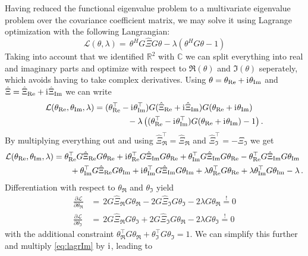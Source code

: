 Having reduced the functional eigenvalue problem to a multivariate eigenvalue problem over the covariance coefficient matrix, we may solve it using Lagrange optimization with the following Langrangian:
\begin{equation}
  \mathcal{L}(\theta,\lambda) = \, \theta^H G \hat{\Xi} G \theta - \lambda ( \theta^H G \theta - 1)
\end{equation}
Taking into account that we identified $\mathbb{R}^2$ with $\mathbb{C}$ we can split everything into real and imaginary parts and optimize with respect to $\Re(\theta)$ and $\Im(\theta)$ seperately, which avoids having to take complex derivatives.
Using $\theta = \theta_{\mathrm{Re}} + \mathrm{i}\mkern1mu \theta_{\mathrm{Im}}$ and $\hat{\Xi} = \hat\Xi_{\mathrm{Re}} + \mathrm{i}\mkern1mu \hat\Xi_{\mathrm{Im}}$ we can write
\begin{align*}
  \mathcal{L}(\theta_{\mathrm{Re}},\theta_{\mathrm{Im}},\lambda) & = 
    (\theta_{\mathrm{Re}}^\top - \mathrm{i}\mkern1mu \theta_{\mathrm{Im}}^\top) G ( \hat{\Xi}_{\mathrm{Re}} + \mathrm{i}\mkern1mu \hat\Xi_{\mathrm{Im}} ) G ( \theta_{\mathrm{Re}} + \mathrm{i}\mkern1mu \theta_{\mathrm{Im}} ) \\
  & \qquad \qquad - \lambda \left( (\theta_{\mathrm{Re}}^\top - \mathrm{i}\mkern1mu \theta_{\mathrm{Im}}^\top ) G (\theta_{\mathrm{Re}} + \mathrm{i}\mkern1mu \theta_{\mathrm{Im}}) - 1 \right).
\end{align*}
By multiplying everything out and using $\hat\Xi_\Re^\top = \hat\Xi_\Re$ and $\hat\Xi_\Im^\top = - \hat\Xi_\Im$ we get
\begin{align*}
  \mathcal{L}(\theta_{\mathrm{Re}},\theta_{\mathrm{Im}},\lambda) 
  & = \theta_{\mathrm{Re}}^\top G \hat\Xi_{\mathrm{Re}} G \theta_{\mathrm{Re}} 
    + \mathrm{i}\mkern1mu \theta_{\mathrm{Re}}^\top G \hat\Xi_{\mathrm{Im}} G \theta_{\mathrm{Re}} 
    + \theta_{\mathrm{Im}}^\top G \hat\Xi_{\mathrm{Im}} G \theta_{\mathrm{Re}}
    - \theta_{\mathrm{Re}}^\top G \hat\Xi_{\mathrm{Im}} G \theta_{\mathrm{Im}} \\
  & \qquad  + \theta_{\mathrm{Im}}^\top G \hat\Xi_{\mathrm{Re}} G \theta_{\mathrm{Im}}
    + \mathrm{i}\mkern1mu \theta_{\mathrm{Im}}^\top G \hat\Xi_{\mathrm{Im}} G \theta_{\mathrm{Im}} 
    + \lambda \theta_{\mathrm{Re}}^\top G \theta_{\mathrm{Re}} + \lambda \theta_{\mathrm{Im}}^\top G \theta_{\mathrm{Im}} - \lambda \,.
\end{align*}
Differentiation with respect to $\theta_\Re$ and $\theta_\Im$ yield
\begin{align}
  \frac{\partial \mathcal{L}}{\partial \theta_\Re} & = \, 
    2G\hat\Xi_\Re G \theta_\Re - 2G\hat\Xi_\Im G \theta_\Im - 2\lambda G\theta_\Re \overset{!}{=} 0 \label{eq:lagrRe}\\
  \frac{\partial \mathcal{L}}{\partial \theta_\Im} & = \,
    2G\hat\Xi_\Re G \theta_\Im + 2G\hat\Xi_\Im G \theta_\Re - 2\lambda G\theta_\Im \overset{!}{=} 0 \label{eq:lagrIm}
\end{align}
with the additional constraint $\theta_\Re^\top G \theta_\Re + \theta_\Im^\top G \theta_\Im = 1$.
We can simplify this further and multiply \cref{eq:lagrIm} by $\mathrm{i}\mkern1mu$, leading to
